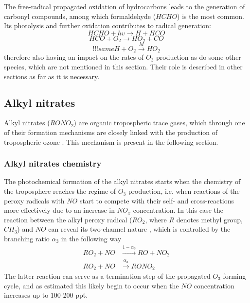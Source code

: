 \documentclass[11pt,a4paper]{article}
\begin{document}
The free-radical propagated oxidation of hydrocarbons leads to the generation of carbonyl compounds, among which formaldehyde ($HCHO$) is the most common. Its photolysis and further oxidation contributes to radical generation:
\begin{equation}\label{reac:HCHO+hv=H+HCO}
HCHO + hv \rightarrow H + HCO
\end{equation}
\begin{equation}\label{reac:HCO+O2=HO2+CO}
HCO + O_2 \rightarrow HO_2 + CO
\end{equation}
\begin{equation}\label{reac:H+O2=HO2}
!!!sameH + O_2 \xrightarrow{M} HO_2
\end{equation}
therefore also having an impact on the rates of $O_3$ production \citep{Fowler2008} as do some other species, which are not mentioned in this section. Their role is described in other sections as far as it is necessary.

\subsection{Alkyl nitrates}
Alkyl nitrates ($RONO_2$) are organic tropospheric trace gases, which through one of their formation mechanisms are closely linked with the production of tropospheric ozone \citep{Reeves2007}. This mechanism is present in the following section.

\subsubsection*{Alkyl nitrates chemistry}

The photochemical formation of the alkyl nitrates starts when the chemistry of the troposphere reaches the regime of $O_3$ production, i.e. when reactions of the peroxy radicals with $NO$ start to compete with their self- and cross-reactions more effectively due to an increase in $NO_x$ concentration. In this case the reaction between the alkyl peroxy radical ($RO_2$, where $R$ denotes methyl group, $CH_3$) and $NO$ can reveal its two-channel nature \citep{Day2003}, which is controlled by the branching ratio $\alpha_3$ in the following way \citep{Roberts1990}
\begin{subequations} \label{reac:RONO2ab}
\begin{align}
RO_2 + NO &\xrightarrow{1-\alpha_3} RO + NO_2 \label{eq:peroxy_no1}\\
RO_2 + NO &\xrightarrow{\alpha_3} RONO_2 \label{eq:peroxy_no2}
\end{align}
\end{subequations}
The latter reaction can serve as a termination step of the propagated $O_3$ forming cycle, and as \citep{Roberts1998} estimated this likely begin to occur when the $NO$ concentration increases up to 100-200 ppt.
\end{document}
